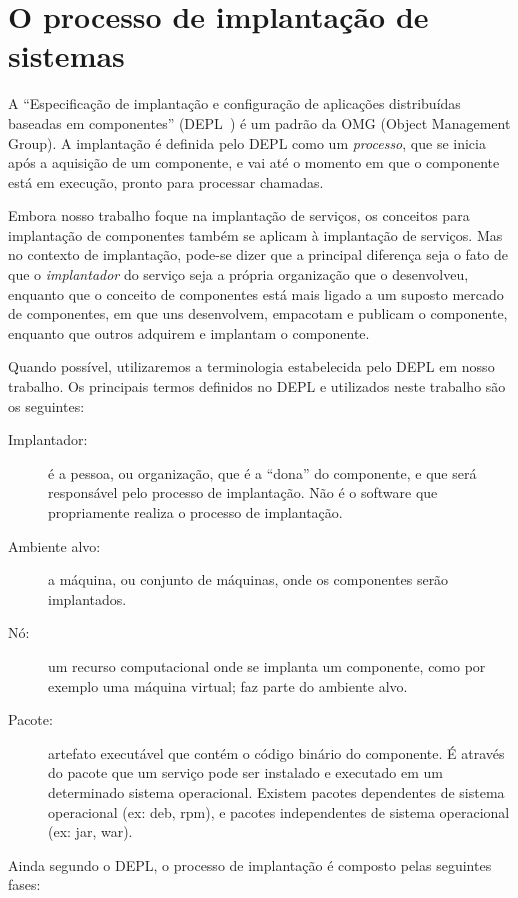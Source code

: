 \section{O processo de implantação de sistemas}
\label{sec:implantacao}

A ``Especificação de implantação e configuração de aplicações distribuídas baseadas em componentes'' (DEPL~\cite{DEPL2006}) é um padrão da OMG (Object Management Group). 
A implantação é definida pelo DEPL como um \emph{processo}, que se inicia após a aquisição de um componente, e vai até o momento em que o componente está em execução, pronto para processar chamadas. 

Embora nosso trabalho foque na implantação de serviços, os conceitos para implantação de componentes também se aplicam à implantação de serviços. 
Mas no contexto de implantação, pode-se dizer que a principal diferença seja o fato de que o \emph{implantador} do serviço seja a própria organização que o desenvolveu, enquanto que o conceito de componentes está mais ligado a um suposto mercado de componentes, em que uns desenvolvem, empacotam e publicam o componente, enquanto que outros adquirem e implantam o componente.

Quando possível, utilizaremos a terminologia estabelecida pelo DEPL em nosso trabalho.
Os principais termos definidos no DEPL e utilizados neste trabalho são os seguintes:

\begin{description}
\item [Implantador:] é a pessoa, ou organização, que é a ``dona'' do componente, e que será responsável pelo processo de implantação. Não é o software que propriamente realiza o processo de implantação.
\item [Ambiente alvo:] a máquina, ou conjunto de máquinas, onde os componentes serão implantados.
\item [Nó:] um recurso computacional onde se implanta um componente, 
como por exemplo uma máquina virtual; faz parte do ambiente alvo.
\item [Pacote:] artefato executável que contém o código binário do componente.
É através do pacote que um serviço pode ser instalado e executado em um determinado
sistema operacional. Existem pacotes dependentes de sistema operacional (ex: deb, rpm),
e pacotes independentes de sistema operacional (ex: jar, war).
\end{description}

Ainda segundo o DEPL, o processo de implantação é composto pelas seguintes fases:

